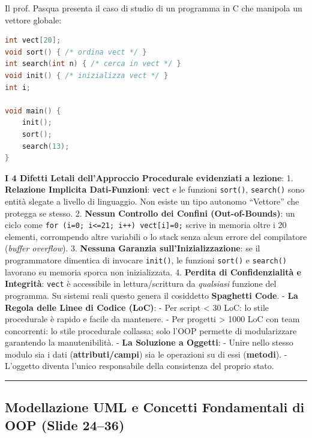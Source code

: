 \documentclass[11pt,a4paper,oneside]{report}
\newcommand{\passthrough}[1]{#1}
\begin{document}
Il prof. Pasqua presenta il caso di studio di un programma in C che
manipola un vettore globale:

\begin{lstlisting}[language=C]
int vect[20];
void sort() { /* ordina vect */ }
int search(int n) { /* cerca in vect */ }
void init() { /* inizializza vect */ }
int i;

void main() {
    init();
    sort();
    search(13);
}
\end{lstlisting}

\textbf{I 4 Difetti Letali dell'Approccio Procedurale evidenziati a
lezione}: 1. \textbf{Relazione Implicita Dati-Funzioni}:
\passthrough{\lstinline!vect!} e le funzioni
\passthrough{\lstinline!sort()!}, \passthrough{\lstinline!search()!}
sono entità slegate a livello di linguaggio. Non esiste un tipo autonomo
``Vettore'' che protegga se stesso. 2. \textbf{Nessun Controllo dei
Confini (Out-of-Bounds)}: un ciclo come
\passthrough{\lstinline!for (i=0; i<=21; i++) vect[i]=0;!} scrive in
memoria oltre i 20 elementi, corrompendo altre variabili o lo stack
senza alcun errore del compilatore (\emph{buffer overflow}). 3.
\textbf{Nessuna Garanzia sull'Inizializzazione}: se il programmatore
dimentica di invocare \passthrough{\lstinline!init()!}, le funzioni
\passthrough{\lstinline!sort()!} e \passthrough{\lstinline!search()!}
lavorano su memoria sporca non inizializzata. 4. \textbf{Perdita di
Confidenzialità e Integrità}: \passthrough{\lstinline!vect!} è
accessibile in lettura/scrittura da \emph{qualsiasi} funzione del
programma. Su sistemi reali questo genera il cosiddetto
\textbf{Spaghetti Code}. - \textbf{La Regola delle Linee di Codice
(LoC)}: - Per script \textless{} 30 LoC: lo stile procedurale è rapido e
facile da mantenere. - Per progetti \textgreater{} 1000 LoC con team
concorrenti: lo stile procedurale collassa; solo l'OOP permette di
modularizzare garantendo la manutenibilità. - \textbf{La Soluzione a
Oggetti}: - Unire nello stesso modulo sia i dati
(\textbf{attributi/campi}) sia le operazioni su di essi
(\textbf{metodi}). - L'oggetto diventa l'unico responsabile della
consistenza del proprio stato.

\begin{center}\rule{0.5\linewidth}{0.5pt}\end{center}

\subsection{Modellazione UML e Concetti Fondamentali di OOP (Slide
24--36)}\label{chap02_modellazione-uml-e-concetti-fondamentali-di-oop-slide-2436}
\end{document}
